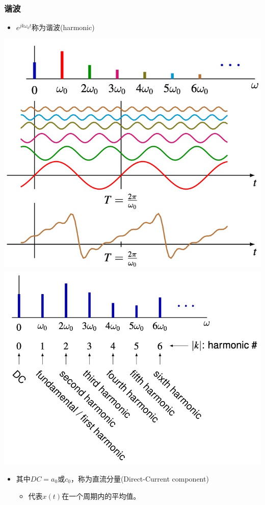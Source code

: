 \documentclass[CJKutf8,xcolor=pdftex,dvipsnames,table]{beamer}
\begin{document}
\begin{CJK*}{UTF8}{song}
  \begin{frame}
    \frametitle{谐波}
    \begin{itemize}
    \item $e^{jk\omega_0 t}$称为谐波(harmonic)
	\end{itemize}  
    \begin{center}
      \includegraphics[scale=.2]{harmonic-1}
      \includegraphics[scale=.2]{harmonic-2}
    \end{center}
    \begin{itemize}
    \item 其中$DC=a_0$或$c_0$，称为直流分量(Direct-Current component) 
      	\begin{itemize}
		\item 代表$x(t)$在一个周期内的平均值。
		\end{itemize}
    \end{itemize}   
  \end{frame}


\end{CJK*}
\end{document}
